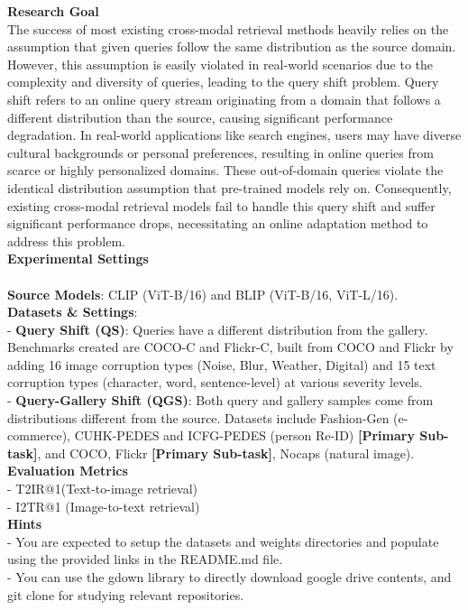 \documentclass[11pt]{article}
\theoremstyle{plain}
\theoremstyle{definition}
\theoremstyle{remark}
\begin{document}
\begin{tcolorbox}[
    colback=white,
    colframe=myPastelGreen,
    title=\textbf{\textcolor{black}{Task Description}},
    boxrule=0.5mm,
    width=\linewidth,
    arc=2mm,
    boxsep=5pt,
    left=6pt, right=6pt, top=6pt, bottom=6pt,
]

\textbf{Research Goal}\\
The success of most existing cross-modal retrieval methods heavily relies on the assumption that given queries follow the same distribution as the source domain. However, this assumption is easily violated in real-world scenarios due to the complexity and diversity of queries, leading to the query shift problem. Query shift refers to an online query stream originating from a domain that follows a different distribution than the source, causing significant performance degradation. In real-world applications like search engines, users may have diverse cultural backgrounds or personal preferences, resulting in online queries from scarce or highly personalized domains. These out-of-domain queries violate the identical distribution assumption that pre-trained models rely on. Consequently, existing cross-modal retrieval models fail to handle this query shift and suffer significant performance drops, necessitating an online adaptation method to address this problem.\\

\textbf{Experimental Settings}\\\\
\textbf{Source Models}: CLIP (ViT-B/16) and BLIP (ViT-B/16, ViT-L/16).\\
\textbf{Datasets \& Settings}:\\
    - \textbf{Query Shift (QS)}: Queries have a different distribution from the gallery. Benchmarks created are COCO-C and Flickr-C, built from COCO and Flickr by adding 16 image corruption types (Noise, Blur, Weather, Digital) and 15 text corruption types (character, word, sentence-level) at various severity levels.\\
    - \textbf{Query-Gallery Shift (QGS)}: Both query and gallery samples come from distributions different from the source. Datasets include Fashion-Gen (e-commerce), CUHK-PEDES and ICFG-PEDES (person Re-ID) \textbf{[Primary Sub-task]}, and COCO, Flickr \textbf{[Primary Sub-task]}, Nocaps (natural image).\\

\textbf{Evaluation Metrics}\\
- T2IR@1(Text-to-image retrieval)\\
- I2TR@1 (Image-to-text retrieval)\\

\textbf{Hints}\\
- You are expected to setup the datasets and weights directories and populate using the provided links in the README.md file.\\
- You can use the gdown library to directly download google drive contents, and git clone for studying relevant repositories.

\end{tcolorbox}
\end{document}
